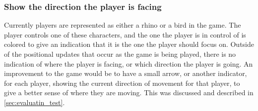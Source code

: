 \subsubsection{Show the direction the player is facing}
Currently players are represented as either a rhino or a bird in the game.
The player controls one of these characters, and the one the player is in control of is colored to give an indication that it is the one the player should focus on.
Outside of the positional updates that occur as the game is being played, there is no indication of where the player is facing, or which direction the player is going.
An improvement to the game would be to have a small arrow, or another indicator, for each player, showing the current direction of movement for that player, to give a better sense of where they are moving.
This was discussed and described in \autoref{sec:evaluatin_test}.
